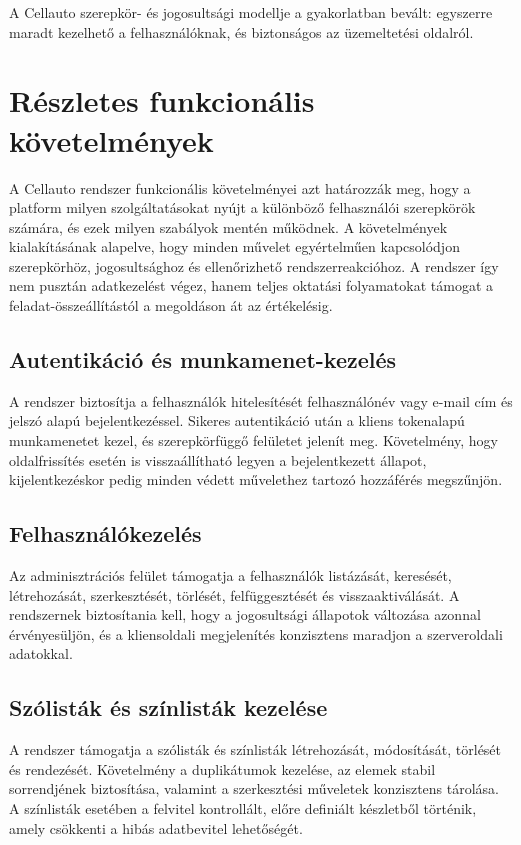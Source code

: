 \documentclass{thesis-ekf}
\begin{document}
A Cellauto szerepkör- és jogosultsági modellje a gyakorlatban bevált: egyszerre maradt kezelhető a felhasználóknak, és biztonságos az üzemeltetési oldalról.

\section{Részletes funkcionális követelmények}
A Cellauto rendszer funkcionális követelményei azt határozzák meg, hogy a platform milyen szolgáltatásokat nyújt a különböző felhasználói szerepkörök számára, és ezek milyen szabályok mentén működnek. A követelmények kialakításának alapelve, hogy minden művelet egyértelműen kapcsolódjon szerepkörhöz, jogosultsághoz és ellenőrizhető rendszerreakcióhoz. A rendszer így nem pusztán adatkezelést végez, hanem teljes oktatási folyamatokat támogat a feladat-összeállítástól a megoldáson át az értékelésig.

\subsection{Autentikáció és munkamenet-kezelés}

A rendszer biztosítja a felhasználók hitelesítését felhasználónév vagy e-mail cím és jelszó alapú bejelentkezéssel. Sikeres autentikáció után a kliens tokenalapú munkamenetet kezel, és szerepkörfüggő felületet jelenít meg. Követelmény, hogy oldalfrissítés esetén is visszaállítható legyen a bejelentkezett állapot, kijelentkezéskor pedig minden védett művelethez tartozó hozzáférés megszűnjön.

\subsection{Felhasználókezelés}

Az adminisztrációs felület támogatja a felhasználók listázását, keresését, létrehozását, szerkesztését, törlését, felfüggesztését és visszaaktiválását. A rendszernek biztosítania kell, hogy a jogosultsági állapotok változása azonnal érvényesüljön, és a kliensoldali megjelenítés konzisztens maradjon a szerveroldali adatokkal.

\subsection{Szólisták és színlisták kezelése}

A rendszer támogatja a szólisták és színlisták létrehozását, módosítását, törlését és rendezését. Követelmény a duplikátumok kezelése, az elemek stabil sorrendjének biztosítása, valamint a szerkesztési műveletek konzisztens tárolása. A színlisták esetében a felvitel kontrollált, előre definiált készletből történik, amely csökkenti a hibás adatbevitel lehetőségét.
\end{document}

